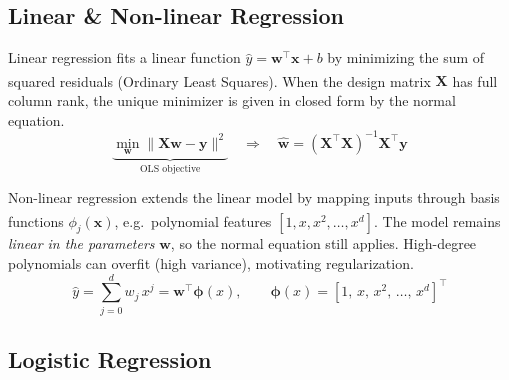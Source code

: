 \subsection{Linear \& Non-linear Regression}

\begin{tcbitemize}[ skin=sectionraster ]
    \tcbitem[title={Linear Regression and the Normal Equation}, raster multicolumn=3]
    Linear regression fits a linear function $\hat{y} = \mathbf{w}^\top \mathbf{x} + b$ by minimizing the sum of squared residuals (Ordinary Least Squares)\textsuperscript{\cite[][pp.~86--90]{iiiCourseMachineLearning}}. When the design matrix $\mathbf{X}$ has full column rank, the unique minimizer is given in closed form by the normal equation.
    \tcblower
    \begin{equation}
        \underbrace{\min_{\mathbf{w}} \|\mathbf{X}\mathbf{w} - \mathbf{y}\|^2}_{\text{OLS objective}}
        \quad\Longrightarrow\quad
        \hat{\mathbf{w}} = (\mathbf{X}^\top\mathbf{X})^{-1}\mathbf{X}^\top\mathbf{y}
    \end{equation}

    \tcbitem[title={Polynomial and Non-linear Regression}, raster multicolumn=3]
    Non-linear regression extends the linear model by mapping inputs through basis functions $\phi_j(\mathbf{x})$, e.g.\ polynomial features $[1, x, x^2, \ldots, x^d]$\textsuperscript{\cite[][pp.~90--97]{iiiCourseMachineLearning}}. The model remains \emph{linear in the parameters} $\mathbf{w}$, so the normal equation still applies. High-degree polynomials can overfit (high variance), motivating regularization.
    \tcblower
    \begin{equation}
        \hat{y} = \sum_{j=0}^{d} w_j\, x^j = \mathbf{w}^\top \boldsymbol{\phi}(x),
        \qquad \boldsymbol{\phi}(x) = [1,\, x,\, x^2,\, \ldots,\, x^d]^\top
    \end{equation}
\end{tcbitemize}

\subsection{Logistic Regression}

